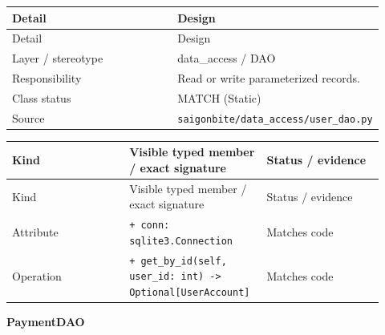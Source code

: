 \begin{longtable}{>{\raggedright\arraybackslash}p{0.4600\linewidth}>{\raggedright\arraybackslash}p{0.4600\linewidth}}
Detail & Design \\
\hline\endfirsthead
Detail & Design \\
\hline\endhead
Layer / stereotype & data\_access / \guillemotleft{}DAO\guillemotright{} \\
Responsibility & Read or write parameterized records. \\
Class status & MATCH (Static) \\
Source & \texttt{saigonbite/\allowbreak{}data\_\allowbreak{}access/\allowbreak{}user\_\allowbreak{}dao.\allowbreak{}py} \\
\end{longtable}
\begin{longtable}{>{\raggedright\arraybackslash}p{0.3067\linewidth}>{\raggedright\arraybackslash}p{0.3067\linewidth}>{\raggedright\arraybackslash}p{0.3067\linewidth}}
Kind & Visible typed member / exact signature & Status / evidence \\
\hline\endfirsthead
Kind & Visible typed member / exact signature & Status / evidence \\
\hline\endhead
Attribute & \texttt{+ conn: sqlite3.\allowbreak{}Connection} & Matches code \\
Operation & \texttt{+ get\_\allowbreak{}by\_\allowbreak{}id(self, user\_\allowbreak{}id: int) -\textgreater{} Optional[UserAccount]} & Matches code \\
\end{longtable}
\textbf{PaymentDAO}

